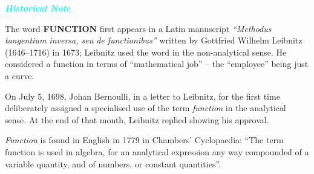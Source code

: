 \documentclass[11pt]{article}
\begin{document}
\begin{mdframed}[
  backgroundcolor=cyan!15,
  linecolor=cyan!40,
  linewidth=0pt,
  leftmargin=0pt,
  rightmargin=0pt,
  innerleftmargin=14pt,
  innerrightmargin=14pt,
  innertopmargin=12pt,
  innerbottommargin=12pt,
  skipabove=10pt,
  skipbelow=10pt,
  split=true
]

\begin{center}
\textcolor{cyan}{\textbf{\textit{Historical Note}}}
\end{center}

The word \textbf{FUNCTION} first appears in a Latin manuscript
\textit{``Methodus tangentium inversa, seu de functionibus''}
written by Gottfried Wilhelm Leibnitz (1646--1716) in 1673; Leibnitz
used the word in the non-analytical sense. He considered a function in
terms of ``mathematical job'' -- the ``employee'' being just a curve.

\medskip

On July 5, 1698, Johan Bernoulli, in a letter to Leibnitz, for the first
time deliberately assigned a specialised use of the term \textit{function}
in the analytical sense. At the end of that month, Leibnitz replied
showing his approval.

\medskip

\textit{Function} is found in English in 1779 in Chambers' Cyclopaedia:
``The term function is used in algebra, for an analytical expression any
way compounded of a variable quantity, and of numbers, or constant
quantities''.

\end{mdframed}
\vspace{1.8cm}

\begin{center}
\end{center}
\end{document}
